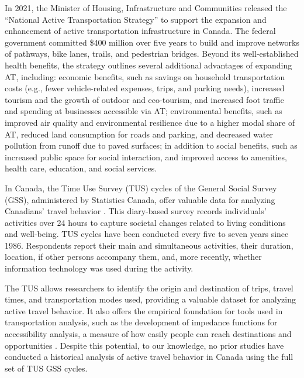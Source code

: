 \documentclass[preprint, 3p,
authoryear]{elsarticle} %
\begin{document}
In 2021, the Minister of Housing, Infrastructure and Communities
released the ``National Active Transportation Strategy''
\citep{canada2021} to support the expansion and enhancement of active
transportation infrastructure in Canada. The federal government
committed \$400 million over five years to build and improve networks of
pathways, bike lanes, trails, and pedestrian bridges. Beyond its
well-established health benefits, the strategy outlines several
additional advantages of expanding AT, including: economic benefits,
such as savings on household transportation costs (e.g., fewer
vehicle-related expenses, trips, and parking needs), increased tourism
and the growth of outdoor and eco-tourism, and increased foot traffic
and spending at businesses accessible via AT; environmental benefits,
such as improved air quality and environmental resilience due to a
higher modal share of AT, reduced land consumption for roads and
parking, and decreased water pollution from runoff due to paved
surfaces; in addition to social benefits, such as increased public space
for social interaction, and improved access to amenities, health care,
education, and social services.

In Canada, the Time Use Survey (TUS) cycles of the General Social Survey
(GSS), administered by Statistics Canada, offer valuable data for
analyzing Canadians' travel behavior \citep{statisticscanada2022}. This
diary-based survey records individuals' activities over 24 hours to
capture societal changes related to living conditions and well-being.
TUS cycles have been conducted every five to seven years since 1986.
Respondents report their main and simultaneous activities, their
duration, location, if other persons accompany them, and, more recently,
whether information technology was used during the activity.

The TUS allows researchers to identify the origin and destination of
trips, travel times, and transportation modes used, providing a valuable
dataset for analyzing active travel behavior. It also offers the
empirical foundation for tools used in transportation analysis, such as
the development of impedance functions for accessibility analysis, a
measure of how easily people can reach destinations and opportunities
\citep{hansen1959, paez2012}. Despite this potential, to our knowledge,
no prior studies have conducted a historical analysis of active travel
behavior in Canada using the full set of TUS GSS cycles.
\end{document}
